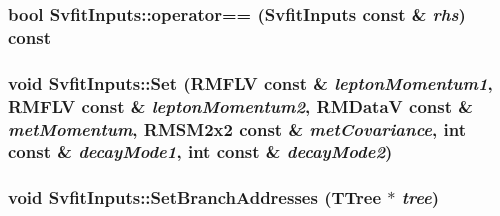 \label{classSvfitInputs_aaab59815bf07360974d7595daa4d33b9}
\hypertarget{classSvfitInputs_a4cd441c132a0b81fa8897da201e7ffba}{
\subsubsection[{operator==}]{\setlength{\rightskip}{0pt plus 5cm}bool SvfitInputs::operator== ({\bf SvfitInputs} const \& {\em rhs}) const}}
\label{classSvfitInputs_a4cd441c132a0b81fa8897da201e7ffba}
\hypertarget{classSvfitInputs_a15284d867ccae598944568329364bcee}{
\subsubsection[{Set}]{\setlength{\rightskip}{0pt plus 5cm}void SvfitInputs::Set (RMFLV const \& {\em leptonMomentum1}, \/  RMFLV const \& {\em leptonMomentum2}, \/  {\bf RMDataV} const \& {\em metMomentum}, \/  {\bf RMSM2x2} const \& {\em metCovariance}, \/  int const \& {\em decayMode1}, \/  int const \& {\em decayMode2})}}
\label{classSvfitInputs_a15284d867ccae598944568329364bcee}
\hypertarget{classSvfitInputs_a7f8739a7ff2404d7e7cf323f537c4d64}{
\subsubsection[{SetBranchAddresses}]{\setlength{\rightskip}{0pt plus 5cm}void SvfitInputs::SetBranchAddresses (TTree $\ast$ {\em tree})}}
\label{classSvfitInputs_a7f8739a7ff2404d7e7cf323f537c4d64}


